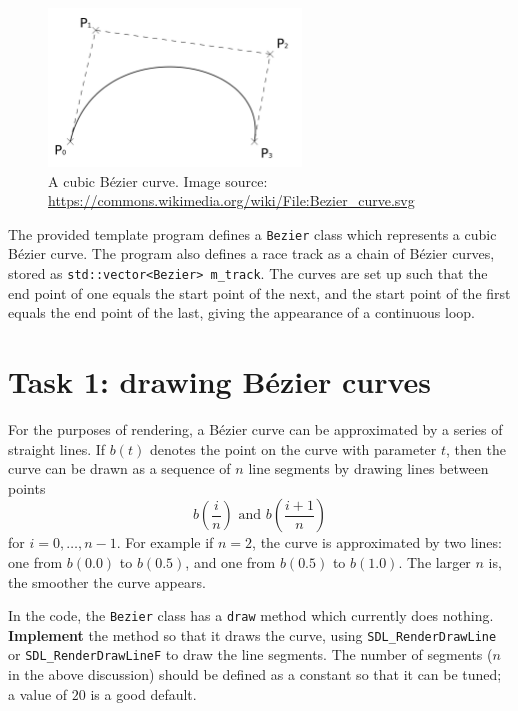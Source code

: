 \documentclass{../../../fal_assignment}
\begin{document}
\begin{figure}[ht]
	\begin{center}
		\includegraphics[width=0.6\textwidth]{bezier}
	\end{center}
	\caption{A cubic B\'ezier curve. Image source: \protect\url{https://commons.wikimedia.org/wiki/File:Bezier_curve.svg}}
	\label{fig:bezier}
\end{figure}

The provided template program defines a \lstinline{Bezier} class which represents a cubic B\'ezier curve.
The program also defines a race track as a chain of B\'ezier curves,
stored as \lstinline{std::vector<Bezier> m_track}.
The curves are set up such that the end point of one equals the start point of the next, and the start point of the first equals the end point of the last, giving the appearance of a continuous loop.

\section*{Task 1: drawing B\'ezier curves}

For the purposes of rendering, a B\'ezier curve can be approximated by a series of straight lines.
If $b(t)$ denotes the point on the curve with parameter $t$,
then the curve can be drawn as a sequence of $n$ line segments by drawing lines between points
$$ b\left(\frac{i}{n}\right) \text{ and } b\left(\frac{i+1}{n}\right) $$
for $i = 0, \dots, n-1$. For example if $n=2$, the curve is approximated by two lines: one from $b(0.0)$ to $b(0.5)$, and one from $b(0.5)$ to $b(1.0)$. The larger $n$ is, the smoother the curve appears.

In the code, the \lstinline{Bezier} class has a \lstinline{draw} method which currently does nothing.
\textbf{Implement} the method so that it draws the curve, using \lstinline{SDL_RenderDrawLine} or \lstinline{SDL_RenderDrawLineF} to draw the line segments. The number of segments ($n$ in the above discussion) should be defined as a constant so that it can be tuned; a value of $20$ is a good default.
\end{document}
